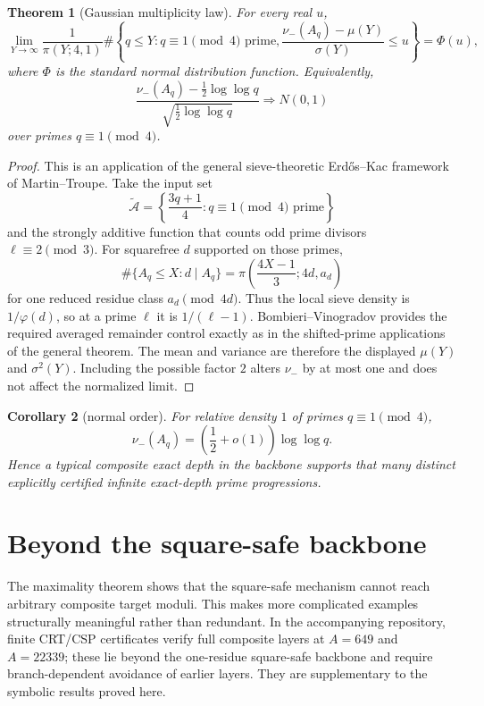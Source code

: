 \documentclass[11pt]{article}
\newtheorem{theorem}{Theorem}
\newtheorem{corollary}[theorem]{Corollary}
\theoremstyle{definition}
\begin{document}
\begin{theorem}[Gaussian multiplicity law]\label{thm:ek}
For every real $u$,
\[
\boxed{
\lim_{Y\to\infty}
\frac{1}{\pi(Y;4,1)}
\#\left\{q\le Y:q\equiv1\pmod4\text{ prime},
\frac{\nu_-(A_q)-\mu(Y)}{\sigma(Y)}\le u\right\}
=\Phi(u),
}
\]
where $\Phi$ is the standard normal distribution function.
Equivalently,
\[
\frac{\nu_-(A_q)-\frac12\log\log q}
{\sqrt{\frac12\log\log q}}
\Longrightarrow N(0,1)
\]
over primes $q\equiv1\pmod4$.
\end{theorem}

\begin{proof}
This is an application of the general sieve-theoretic Erd\H{o}s--Kac framework of Martin--Troupe. Take the input set
\[
\widetilde{\mathcal A}=
\left\{\frac{3q+1}{4}:q\equiv1\pmod4\text{ prime}\right\}
\]
and the strongly additive function that counts odd prime divisors $\ell\equiv2\pmod3$. For squarefree $d$ supported on those primes,
\[
\#\{A_q\le X:d\mid A_q\}
=
\pi\!\left(\frac{4X-1}{3};4d,a_d\right)
\]
for one reduced residue class $a_d\pmod{4d}$. Thus the local sieve density is $1/\varphi(d)$, so at a prime $\ell$ it is $1/(\ell-1)$. Bombieri--Vinogradov provides the required averaged remainder control exactly as in the shifted-prime applications of the general theorem. The mean and variance are therefore the displayed $\mu(Y)$ and $\sigma^2(Y)$. Including the possible factor $2$ alters $\nu_-$ by at most one and does not affect the normalized limit.
\end{proof}

\begin{corollary}[normal order]
For relative density $1$ of primes $q\equiv1\pmod4$,
\[
\nu_-(A_q)=\left(\frac12+o(1)\right)\log\log q.
\]
Hence a typical composite exact depth in the backbone supports that many distinct explicitly certified infinite exact-depth prime progressions.
\end{corollary}

\section{Beyond the square-safe backbone}
The maximality theorem shows that the square-safe mechanism cannot reach arbitrary composite target moduli. This makes more complicated examples structurally meaningful rather than redundant. In the accompanying repository, finite CRT/CSP certificates verify full composite layers at $A=649$ and $A=22339$; these lie beyond the one-residue square-safe backbone and require branch-dependent avoidance of earlier layers. They are supplementary to the symbolic results proved here.
\end{document}
